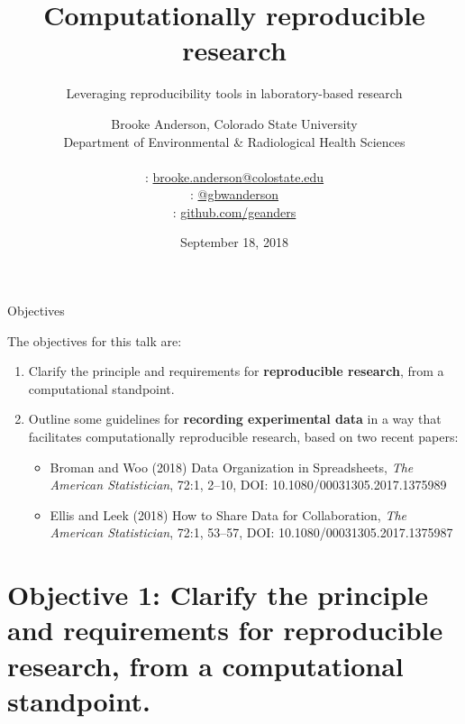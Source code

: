 \documentclass[ignorenonframetext,]{beamer}
\title{Computationally reproducible research}
\subtitle{Leveraging reproducibility tools in laboratory-based research}
\date{September 18, 2018}
\author[Anderson]{
  Brooke Anderson, Colorado State University \\
  Department of Environmental \& Radiological Health Sciences \\ \\
  {\small \faEnvelope: \url{brooke.anderson@colostate.edu}} \\
  {\small \faTwitter: \href{www.twitter.com/gbwanderson}{@gbwanderson}} \\
  {\small \faGithub:  \url{github.com/geanders}} \\ 
  }
\date{}
\providecommand{\tightlist}{%
  \setlength{\itemsep}{0pt}\setlength{\parskip}{0pt}}
\begin{document}
\begin{frame}
  \titlepage
\end{frame}

\begin{frame}{Objectives}
\protect\hypertarget{objectives}{}

The objectives for this talk are:

\begin{enumerate}
\tightlist
\item
  Clarify the principle and requirements for \textbf{reproducible
  research}, from a computational standpoint.
\item
  Outline some guidelines for \textbf{recording experimental data} in a
  way that facilitates computationally reproducible research, based on
  two recent papers:

  \begin{itemize}
  \tightlist
  \item
    Broman and Woo (2018) Data Organization in Spreadsheets, \emph{The
    American Statistician}, 72:1, 2--10, DOI:
    10.1080/00031305.2017.1375989
  \item
    Ellis and Leek (2018) How to Share Data for Collaboration, \emph{The
    American Statistician}, 72:1, 53--57, DOI:
    10.1080/00031305.2017.1375987
  \end{itemize}
\end{enumerate}

\end{frame}

\hypertarget{objective-1-clarify-the-principle-and-requirements-for-reproducible-research-from-a-computational-standpoint.}{%
\section{Objective 1: Clarify the principle and requirements for
reproducible research, from a computational
standpoint.}\label{objective-1-clarify-the-principle-and-requirements-for-reproducible-research-from-a-computational-standpoint.}}
\end{document}
